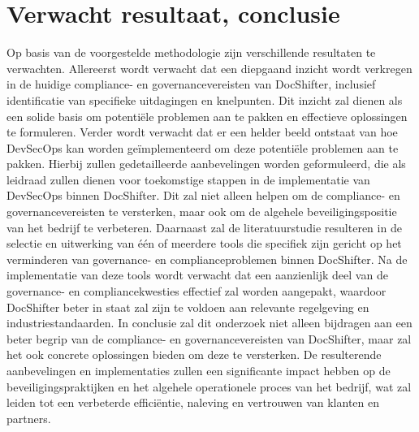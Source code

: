 \documentclass{hogent-article}
\begin{document}
    \section{Verwacht resultaat, conclusie}%
    \label{sec:verwachte_resultaten}
    Op basis van de voorgestelde methodologie zijn verschillende resultaten te verwachten. Allereerst wordt verwacht dat een diepgaand inzicht wordt verkregen in de huidige compliance- en governancevereisten van DocShifter, inclusief identificatie van specifieke uitdagingen en knelpunten. Dit inzicht zal dienen als een solide basis om potentiële problemen aan te pakken en effectieve oplossingen te formuleren.
    Verder wordt verwacht dat er een helder beeld ontstaat van hoe DevSecOps kan worden geïmplementeerd om deze potentiële problemen aan te pakken. Hierbij zullen gedetailleerde aanbevelingen worden geformuleerd, die als leidraad zullen dienen voor toekomstige stappen in de implementatie van DevSecOps binnen DocShifter. Dit zal niet alleen helpen om de compliance- en governancevereisten te versterken, maar ook om de algehele beveiligingspositie van het bedrijf te verbeteren.
    Daarnaast zal de literatuurstudie resulteren in de selectie en uitwerking van één of meerdere tools die specifiek zijn gericht op het verminderen van governance- en complianceproblemen binnen DocShifter. Na de implementatie van deze tools wordt verwacht dat een aanzienlijk deel van de governance- en compliancekwesties effectief zal worden aangepakt, waardoor DocShifter beter in staat zal zijn te voldoen aan relevante regelgeving en industriestandaarden.
    In conclusie zal dit onderzoek niet alleen bijdragen aan een beter begrip van de compliance- en governancevereisten van DocShifter, maar zal het ook concrete oplossingen bieden om deze te versterken. De resulterende aanbevelingen en implementaties zullen een significante impact hebben op de beveiligingspraktijken en het algehele operationele proces van het bedrijf, wat zal leiden tot een verbeterde efficiëntie, naleving en vertrouwen van klanten en partners.
         
    
    \printbibliography[heading=bibintoc]
    
\end{document}
